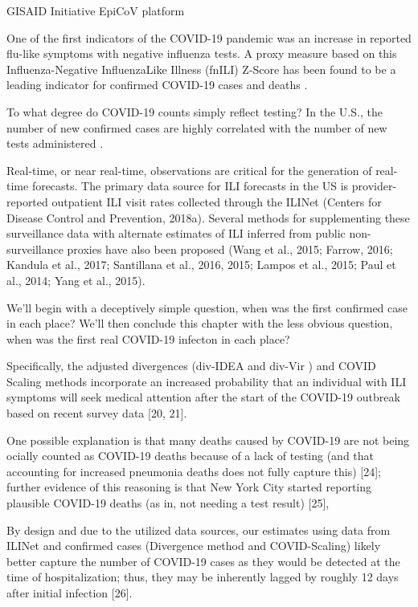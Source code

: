 \documentclass[
]{book}
\begin{document}
GISAID Initiative EpiCoV platform

One of the first indicators of the COVID-19 pandemic was an increase in reported flu-like symptoms with negative influenza tests. A proxy measure based on this Influenza-Negative InfluenzaLike Illness (fnILI) Z-Score has been found to be a leading indicator for confirmed COVID-19 cases and deaths \citep{mirzaInfluenzaNegativeInfluenzaLikeIllness2020}.

To what degree do COVID-19 counts simply reflect testing? In the U.S., the number of new confirmed cases are highly correlated with the number of new tests administered \citep{kaashoekCOVID19PositiveCases2020}.

\citep{luForecastingFluActivity2020}

\citep{NeartermForecastsInfluenzalike2019}

Real-time, or near real-time, observations are critical for the generation of real-time forecasts. The primary data source for ILI forecasts in the US is provider-reported outpatient ILI visit rates collected through the ILINet (Centers for Disease Control and Prevention, 2018a). Several methods for supplementing these surveillance data with alternate estimates of ILI inferred from public non-surveillance proxies have also been proposed (Wang et al., 2015; Farrow, 2016; Kandula et al., 2017; Santillana et al., 2016, 2015; Lampos et al., 2015; Paul et al., 2014; Yang et al., 2015).

\citep{luEstimatingPrevalenceCOVID192020}

We'll begin with a deceptively simple question, when was the first confirmed case in each place? We'll then conclude this chapter with the less obvious question, when was the first real COVID-19 infecton in each place?

Specifically, the adjusted divergences (div-IDEA and div-Vir ) and COVID Scaling
methods incorporate an increased probability that an individual with ILI symptoms will seek
medical attention after the start of the COVID-19 outbreak based on recent survey data {[}20, 21{]}.

One possible explanation is that many deaths caused by COVID-19 are not being ocially counted as COVID-19
deaths because of a lack of testing (and that accounting for increased pneumonia deaths does not
fully capture this) {[}24{]}; further evidence of this reasoning is that New York City started reporting
plausible COVID-19 deaths (as in, not needing a test result) {[}25{]},

By design and due to the utilized data sources, our estimates using data from ILINet and
confirmed cases (Divergence method and COVID-Scaling) likely better capture the number of
COVID-19 cases as they would be detected at the time of hospitalization; thus, they may be inherently lagged by roughly 12 days after initial infection {[}26{]}.
\end{document}
